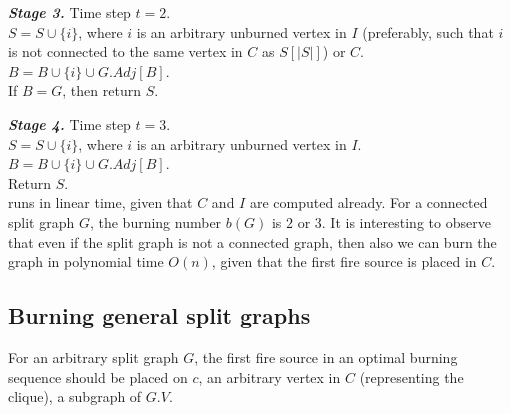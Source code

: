\textbf{\textit{Stage 3.}} Time step $t=2$.\\
$S = S\cup \{i\}$, where $i$ is an arbitrary unburned vertex in $I$ (preferably, such that $i$ is not connected to the same vertex in $C$ as $S[|S|]$) or $C$. $B = B \cup \{i\} \cup G.Adj[B]$.\\
If $B=G$, then return $S$.

\textbf{\textit{Stage 4.}} Time step $t=3$.\\
$S = S\cup \{i\}$, where $i$ is an arbitrary unburned vertex in $I$. $B = B \cup \{i\} \cup G.Adj[B]$.\\
Return $S$.\\

 runs in linear time, given that $C$ and $I$ are computed already. For a connected split graph $G$, the burning number $b(G)$ is $2$ or $3$. It is interesting to observe that even if the split graph is not a connected graph, then also we can burn the graph in polynomial time $O(n)$, given that the first fire source is placed in $C$.

\subsection{Burning general split graphs}

\begin{theorem}\label{theorem:burning-general-split-graphs}
    For an arbitrary split graph $G$, the first fire source in an optimal burning sequence should be placed on $c$, an arbitrary vertex in $C$ (representing the clique), a subgraph of $G.V$.
\end{theorem}

